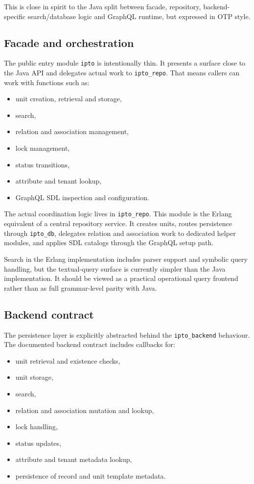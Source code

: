 This is close in spirit to the Java split between facade, repository, backend-specific search/database logic and GraphQL runtime, but expressed in OTP style.

\subsection{Facade and orchestration}

The public entry module \texttt{ipto} is intentionally thin. It presents a surface close to the Java API and delegates actual work to \texttt{ipto\_repo}. That means callers can work with functions such as:
\begin{itemize}
\item unit creation, retrieval and storage,
\item search,
\item relation and association management,
\item lock management,
\item status transitions,
\item attribute and tenant lookup,
\item GraphQL SDL inspection and configuration.
\end{itemize}

The actual coordination logic lives in \texttt{ipto\_repo}. This module is the Erlang equivalent of a central repository service. It creates units, routes persistence through \texttt{ipto\_db}, delegates relation and association work to dedicated helper modules, and applies SDL catalogs through the GraphQL setup path.

Search in the Erlang implementation includes parser support and symbolic query handling, but the textual-query surface is currently simpler than the Java implementation. It should be viewed as a practical operational query frontend rather than as full grammar-level parity with Java.

\subsection{Backend contract}

The persistence layer is explicitly abstracted behind the \texttt{ipto\_backend} behaviour. The documented backend contract includes callbacks for:
\begin{itemize}
\item unit retrieval and existence checks,
\item unit storage,
\item search,
\item relation and association mutation and lookup,
\item lock handling,
\item status updates,
\item attribute and tenant metadata lookup,
\item persistence of record and unit template metadata.
\end{itemize}

